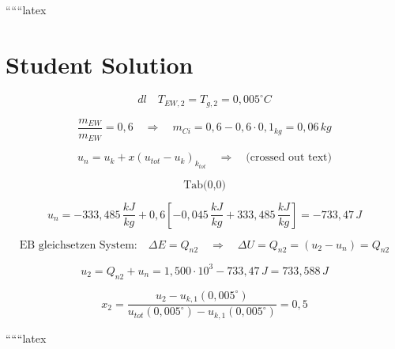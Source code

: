 ``````latex


\section*{Student Solution}

\begin{equation}
d l \quad T_{EW,2} = T_{g,2} = 0,005^\circ C
\end{equation}

\begin{equation}
\frac{m_{EW}}{m_{EW}} = 0,6 \quad \Rightarrow \quad m_{Ci} = 0,6 - 0,6 \cdot 0,1_{kg} = 0,06 \, kg
\end{equation}

\begin{equation}
u_{n} = u_{k} + x \left( u_{tot} - u_{k} \right)_{k_{tot}} \quad \Rightarrow \quad \text{(crossed out text)}
\end{equation}

\begin{equation}
\text{Tab(0,0)}
\end{equation}

\begin{equation}
u_{n} = -333,485 \, \frac{kJ}{kg} + 0,6 \left[ -0,045 \, \frac{kJ}{kg} + 333,485 \, \frac{kJ}{kg} \right] = -733,47 \, J
\end{equation}

\begin{equation}
\text{EB gleichsetzen System:} \quad \Delta E = Q_{n2} \quad \Rightarrow \quad \Delta U = Q_{n2} = (u_{2} - u_{n}) = Q_{n2}
\end{equation}

\begin{equation}
u_{2} = Q_{n2} + u_{n} = 1,500 \cdot 10^{3} - 733,47 \, J = 733,588 \, J
\end{equation}

\begin{equation}
x_{2} = \frac{u_{2} - u_{k,1} (0,005^\circ)}{u_{tot}(0,005^\circ) - u_{k,1} (0,005^\circ)} = 0,5
\end{equation}

``````latex


